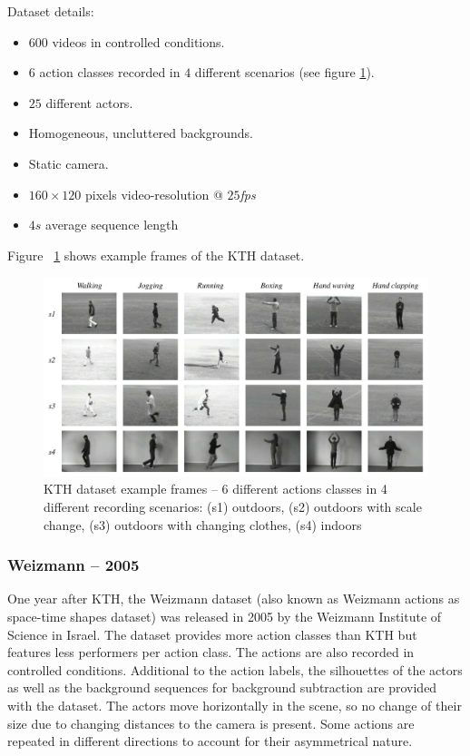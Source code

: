 Dataset details: \cite{schuldt_recognizing_2004}
\begin{itemize}
    \item $600$ videos in controlled conditions.
    \item $6$ action classes recorded in $4$ different scenarios (see figure \ref{fig:kth_example}).
    \item $25$ different actors.
    \item Homogeneous, uncluttered backgrounds.
    \item Static camera.
    \item $160 \times 120$ pixels video-resolution @ $25$\textit{fps}
    \item $4s$ average sequence length
\end{itemize}

Figure ~\ref{fig:kth_example} shows example frames of the KTH dataset.

\begin{figure}[H]
    \centering
    \includegraphics[width=.9\textwidth]{img_datasets/kth_example}
    \caption{KTH dataset example frames -- 6 different actions classes in 4 different recording scenarios: (s1) outdoors, (s2) outdoors with scale change, (s3) outdoors with changing clothes, (s4) indoors \cite{schuldt_recognizing_2004}}
    \label{fig:kth_example}
\end{figure}


\subsubsection{Weizmann -- 2005}
One year after KTH, the Weizmann dataset \cite{blank_actions_2005} (also known as Weizmann actions as space-time shapes dataset) was released in 2005 by the Weizmann Institute of Science in Israel.
The dataset provides more action classes than KTH but features less performers per action class.
The actions are also recorded in controlled conditions.
Additional to the action labels, the silhouettes of the actors as well as the background sequences for background subtraction are provided with the dataset.
The actors move horizontally in the scene, so no change of their size due to changing distances to the camera is present.
Some actions are repeated in different directions to account for their asymmetrical nature.

